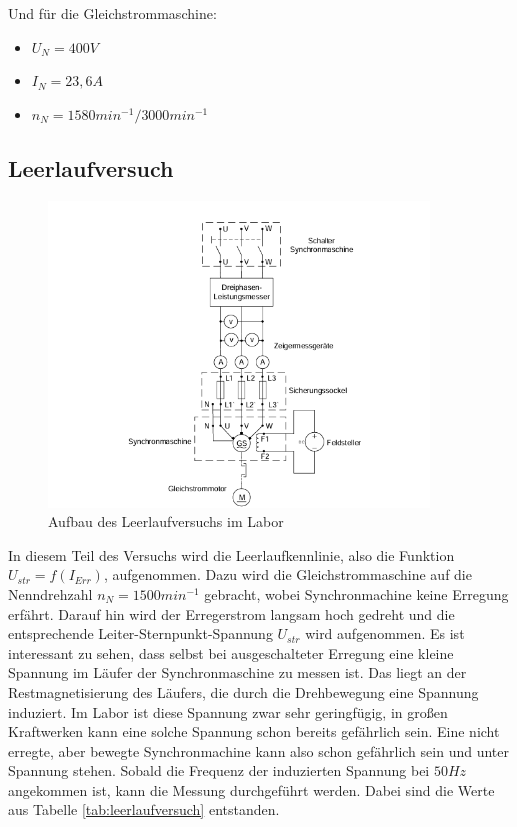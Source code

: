 \documentclass{report}
\begin{document}
Und für die Gleichstrommaschine:

\begin{itemize}
	\item $U_{N} = 400V$
	\item $I_{N} = 23,6A$
	\item $n_{N} = 1580min^{-1}/3000min^{-1}$
\end{itemize}


\subsection{Leerlaufversuch}

\begin{figure}[!ht]
  \centering
  \includegraphics[width=0.9\textwidth]{./assets/img/leerlauf_aufbau.png}
  \caption{Aufbau des Leerlaufversuchs im Labor}
  \label{fig:leerlauf_aufbau}
\end{figure}

In diesem Teil des Versuchs wird die Leerlaufkennlinie, also die Funktion $U_{str} = f(I_{Err})$, aufgenommen. Dazu wird die Gleichstrommaschine auf die Nenndrehzahl $n_{N} = 1500min^{-1}$ gebracht, wobei Synchronmachine keine Erregung erfährt. Darauf hin wird der Erregerstrom langsam hoch gedreht und die entsprechende Leiter-Sternpunkt-Spannung $U_{str}$ wird aufgenommen. Es ist interessant zu sehen, dass selbst bei ausgeschalteter Erregung eine kleine Spannung im Läufer der Synchronmaschine zu messen ist. Das liegt an der Restmagnetisierung des Läufers, die durch die Drehbewegung eine Spannung induziert. Im Labor ist diese Spannung zwar sehr geringfügig, in großen Kraftwerken kann eine solche Spannung schon bereits gefährlich sein. Eine nicht erregte, aber bewegte Synchronmachine kann also schon gefährlich sein und unter Spannung stehen. Sobald die Frequenz der induzierten Spannung bei $50Hz$ angekommen ist, kann die Messung durchgeführt werden. Dabei sind die Werte aus Tabelle \ref{tab:leerlaufversuch} entstanden.
\end{document}

